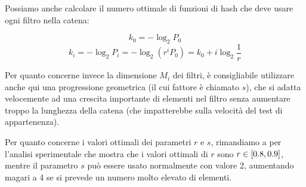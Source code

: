 Possiamo anche calcolare il numero ottimale di funzioni di hash che deve usare ogni filtro nella
catena:

$$ k_0 = -\log_2{P_0} $$
$$ k_i = -\log_2{P_i} = -\log_2{(r^iP_0)} = k_0 + i \log_2{\frac{1}{r}} $$

Per quanto concerne invece la dimensione $M_i$ dei filtri, è consigliabile utilizzare anche qui
una progressione geometrica (il cui fattore è chiamato $s$), che si adatta velocemente ad una
crescita importante di elementi nel filtro senza aumentare troppo la lunghezza della catena (che
impatterebbe sulla velocità del test di appartenenza). 

Per quanto concerne i valori ottimali dei parametri $r$ e $s$, rimandiamo a \cite{bloom-scalable} per
l'analisi sperimentale che mostra che i valori ottimali di $r$ sono $r \in \interval{0.8}{0.9}$,
mentre il parametro $s$ può essere usato normalmente con valore \num{2}, aumentando magari a \num{4}
se si prevede un numero molto elevato di elementi.


